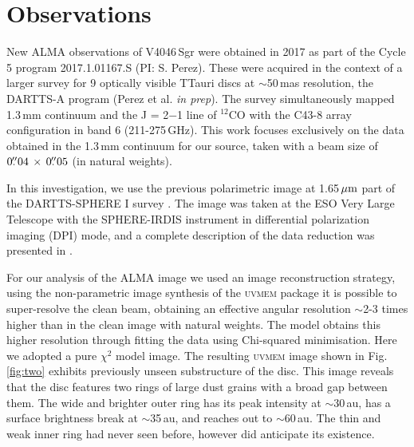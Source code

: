 \documentclass[letters,usenatbib,times]{mnras}
\begin{document}
\section{Observations} \label{sec:Observations}


New ALMA observations of V4046\,Sgr were obtained in 2017 as part of the Cycle 5 program 2017.1.01167.S (PI: S. Perez). These were acquired in the context of a larger survey for 9 optically visible TTauri discs at $\sim$50\,mas resolution, the DARTTS-A program (Perez et al. {\em in prep}). The survey simultaneously mapped 1.3\,mm continuum and the J = 2$-$1 line of $^{12}$CO with the C43-8 array configuration in band 6 (211-275\,GHz). This work focuses exclusively on the data obtained in the 1.3\,mm continuum for our source, taken with a beam size of $0\hbox{$.\!\!^{\prime\prime}$}04 \,\times \, 0\hbox{$.\!\!^{\prime\prime}$}05$ (in natural weights).

In this investigation, we use the previous polarimetric image at 1.65\,$\hbox{$\mu$m}$ part of the DARTTS-SPHERE I survey \citep{Avenhaus_2018}. The image was taken at the ESO Very Large Telescope with the SPHERE-IRDIS instrument in differential polarization imaging (DPI) mode, and a complete description of the data reduction was presented in \citet{Avenhaus_2018}. 

For our analysis of the ALMA image we used an image reconstruction strategy, using the non-parametric image synthesis of the \textsc{uvmem} package \citep{2006ApJ...639..951C, 2018A&C....22...16C} it is possible to super-resolve the clean beam, obtaining an effective angular resolution $\sim$2-3 times higher than in the clean image with natural weights. The model obtains this higher resolution through fitting the data using Chi-squared minimisation. Here we adopted a pure $\chi^2$ model image. The resulting \textsc{uvmem} image shown in Fig. \ref{fig:two} exhibits previously unseen substructure of the disc. This image reveals that the disc features two rings of large dust grains with a broad gap between them. The wide and brighter outer ring has its peak intensity at $\sim$30\,au, has a surface brightness break at $\sim$35\,au, and reaches out to $\sim$60\,au. The thin and weak inner ring had never seen before, however \citet{Ru_z_Rodr_guez_2019} did anticipate its existence.
\end{document}
